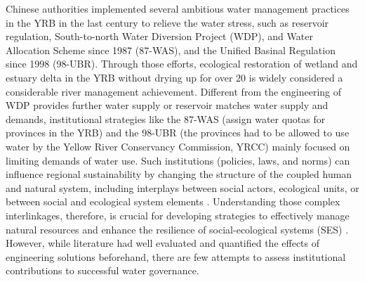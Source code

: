 Chinese authorities implemented several ambitious water management practices in the YRB in the last century to relieve the water stress, such as reservoir regulation, South-to-north Water Diversion Project (WDP), and Water Allocation Scheme since 1987 (87-WAS), and the Unified Basinal Regulation since 1998 (98-UBR).
Through those efforts, ecological restoration of wetland and estuary delta in the YRB without drying up for over $20$ is widely considered a considerable river management achievement.
Different from the engineering of WDP provides further water supply or reservoir matches water supply and demands, institutional strategies like the 87-WAS (assign water quotas for provinces in the YRB) and the 98-UBR (the provinces had to be allowed to use water by the Yellow River Conservancy Commission, YRCC) mainly focused on limiting demands of water use.
Such institutions (policies, laws, and norms) can influence regional sustainability by changing the structure of the coupled human and natural system, including interplays between social actors, ecological units, or between social and ecological system elements \cite{young2008,cumming2020b,lien2020, bodin2017b}.
Understanding those complex interlinkages, therefore, is crucial for developing strategies to effectively manage natural resources and enhance the resilience of social-ecological systems (SES) \cite{kluger2020}.
However, while literature had well evaluated and quantified the effects of engineering solutions beforehand, there are few attempts to assess institutional contributions to successful water governance.

